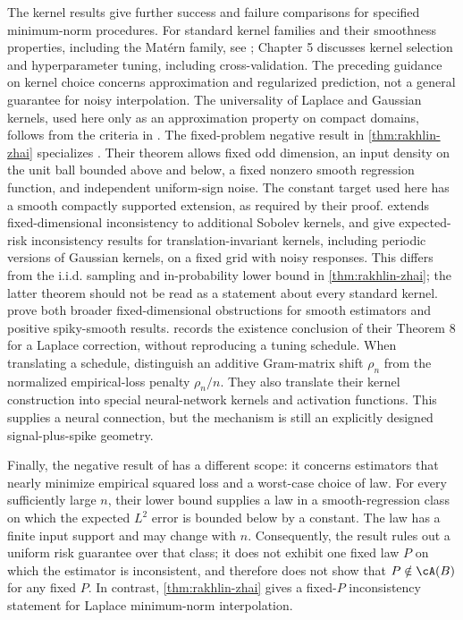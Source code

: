 \documentclass[11pt,twoside]{article}
\theoremstyle{definition}
\theoremstyle{remark}
\begin{document}
The kernel results give further success and failure comparisons for
specified minimum-norm procedures. For standard kernel families and their
smoothness properties, including the Mat\'ern family, see
\citet[Chapter 4]{rasmussen2006}; Chapter 5 discusses kernel selection and
hyperparameter tuning, including cross-validation. The preceding guidance
on kernel choice concerns approximation and regularized prediction, not a
general guarantee for noisy interpolation. The universality of Laplace and
Gaussian kernels, used here only as an approximation property on compact
domains, follows from the criteria in \citet{sriperumbudur2010}.
The fixed-problem negative result in
\cref{thm:rakhlin-zhai} specializes
\citet[Theorem 1]{rakhlin2019}. Their theorem allows fixed odd dimension,
an input density on the unit ball bounded above and below, a fixed nonzero
smooth regression function, and independent uniform-sign noise. The constant
target used here has a smooth compactly supported extension, as required
by their proof. \citet{buchholz2022} extends fixed-dimensional
inconsistency to additional Sobolev kernels, and \citet{beaglehole2023}
give expected-risk inconsistency results for translation-invariant kernels,
including periodic versions of Gaussian kernels, on a fixed grid with noisy
responses. This differs from the i.i.d. sampling and in-probability lower
bound in \cref{thm:rakhlin-zhai}; the latter theorem should not be read as
a statement about every standard kernel.
\citet{haas2023} prove both broader fixed-dimensional obstructions for smooth
estimators and positive spiky-smooth results.  records the
existence conclusion of their Theorem 8 for a Laplace correction, without
reproducing a tuning schedule. When translating a schedule, distinguish an
additive Gram-matrix shift $\rho_n$ from the normalized empirical-loss
penalty $\rho_n/n$. They also translate their kernel construction into special
neural-network kernels and activation functions. This supplies a neural
connection, but the mechanism is still an explicitly designed
signal-plus-spike geometry.

Finally, the negative result of \citet{kohler2021} has a different scope:
it concerns estimators that nearly minimize empirical squared loss and a
worst-case choice of law. For every sufficiently large $n$, their lower bound
supplies a law in a smooth-regression class on which the expected $L^2$ error is bounded below by
a constant. The law has a finite input support and may change with $n$.
Consequently, the result rules out a uniform risk guarantee over that class;
it does not exhibit one fixed law $P$ on which the estimator is inconsistent,
and therefore does not show that $P\notin\cA(B)$ for any fixed $P$. In
contrast, \cref{thm:rakhlin-zhai} gives a fixed-$P$ inconsistency statement for
Laplace minimum-norm interpolation.
\end{document}
